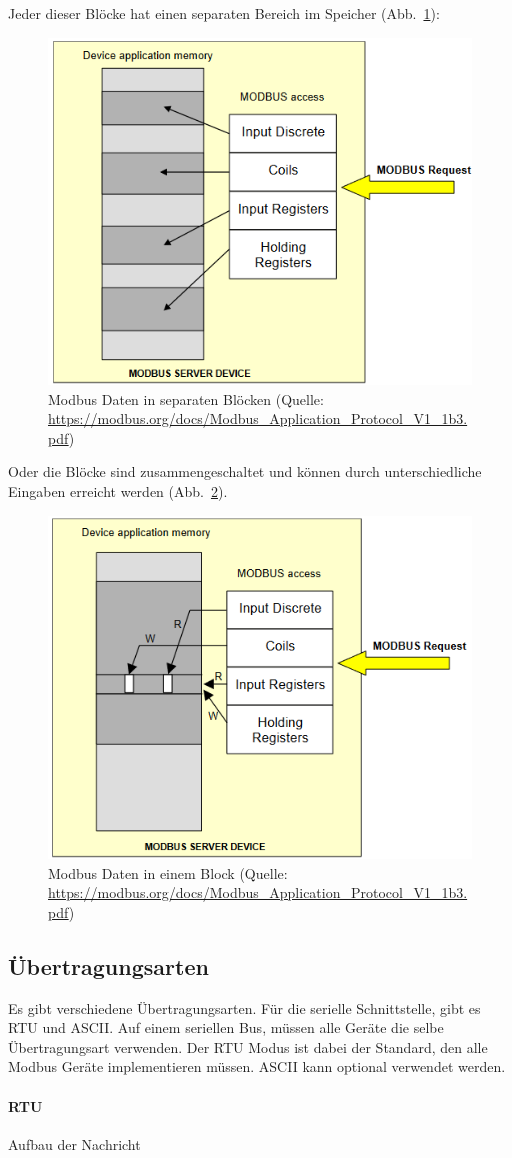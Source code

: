 Jeder dieser Blöcke hat einen separaten Bereich im Speicher (Abb.~\ref{fig:modbus_register_many_blocks}):
\begin{figure}[H]
	\centering
	\includegraphics[width=0.4\linewidth]{Bilder/Modbus_Data_Model_with_separate_block}
	\caption{Modbus Daten in separaten Blöcken (Quelle: \url{https://modbus.org/docs/Modbus_Application_Protocol_V1_1b3.pdf})}
	\label{fig:modbus_register_many_blocks}
\end{figure}

Oder die Blöcke sind zusammengeschaltet und können durch unterschiedliche Eingaben erreicht werden (Abb.~\ref{fig:modbus_register_one_block}).
\begin{figure}[H]
	\centering
	\includegraphics[width=0.4\linewidth]{Bilder/Modbus_Data_Model_with_one_block}
	\caption{Modbus Daten in einem Block (Quelle: \url{https://modbus.org/docs/Modbus_Application_Protocol_V1_1b3.pdf})}
	\label{fig:modbus_register_one_block}
\end{figure}

\subsection{Übertragungsarten}
Es gibt verschiedene Übertragungsarten. Für die serielle Schnittstelle, gibt es RTU und ASCII. Auf einem seriellen Bus, müssen alle Geräte die selbe Übertragungsart verwenden. Der RTU Modus ist dabei der Standard, den alle Modbus Geräte implementieren müssen. ASCII kann optional verwendet werden.
\paragraph{RTU}
Aufbau der Nachricht

